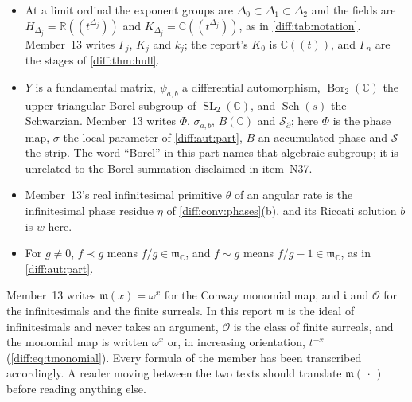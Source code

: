 \documentclass[11pt,letterpaper]{article}
\numberwithin{equation}{section}
\theoremstyle{definition}
\theoremstyle{remark}
\newcommand{\SC}{\mathbf{No}[i]}
\newcommand{\R}{\mathbb R}
\newcommand{\C}{\mathbb C}
\newcommand{\der}{\partial}
\newcommand{\Ofin}{\mathcal O}
\newcommand{\mm}{\mathfrak m}
\newcommand{\Strip}{\mathcal S}
\newcommand{\SL}{\operatorname{SL}}
\newcommand{\Sch}{\operatorname{Sch}}
\newcommand{\Bor}{\operatorname{Bor}}
\newcommand{\Sol}{\operatorname{Sol}}
\begin{document}
\begin{convention}
\begin{itemize}[leftmargin=1.6em]
\cref{diff:eq:matpinneyclassical}, and $\mathrm{Wr}_{s}$ is the same expression
for $\der_{s}$; member~13 writes $W$, which is a unitary matrix here. For a
differential subfield $F\subseteq\SC$ and $Q\in F$,
$\Sol_{F}(Q)=\{y\in F:\der^{2}y+Qy=0\}$.
\item At a limit ordinal the exponent groups are $\Delta_{0}\subset
\Delta_{1}\subset\Delta_{2}$ and the fields are
$H_{\Delta_{j}}=\R((t^{\Delta_{j}}))$ and $K_{\Delta_{j}}=\C((t^{\Delta_{j}}))$,
as in \cref{diff:tab:notation}. Member~13 writes $\Gamma_{j}$, $K_{j}$ and
$k_{j}$; the report's $K_{0}$ is $\C((t))$, and $\Gamma_{n}$ are the stages of
\cref{diff:thm:hull}.
\item $Y$ is a fundamental matrix, $\psi_{a,b}$ a differential automorphism,
$\Bor_{2}(\C)$ the upper triangular Borel subgroup of $\SL_{2}(\C)$, and
$\Sch(s)$ the Schwarzian. Member~13 writes $\Phi$, $\sigma_{a,b}$, $B(\C)$ and
$\mathcal S_{\der}$; here $\Phi$ is the phase map, $\sigma$ the local parameter
of \cref{diff:aut:part}, $B$ an accumulated phase and $\Strip$ the strip. The
word ``Borel'' in this part names that algebraic subgroup; it is unrelated to
the Borel summation disclaimed in item~N37.
\item Member~13's real infinitesimal primitive $\theta$ of an angular rate is
the infinitesimal phase residue $\eta$ of \cref{diff:conv:phases}(b), and its
Riccati solution $b$ is $w$ here.
\item For $g\neq0$, $f\prec g$ means $f/g\in\mm_{\C}$, and $f\sim g$ means
$f/g-1\in\mm_{\C}$, as in \cref{diff:aut:part}.
\end{itemize}
\end{convention}

\begin{warning}[Member~13's $\mathfrak m$ is not this report's $\mm$]
\label{diff:cp:warn:frakm}
Member~13 writes $\mathfrak m(x)=\omega^{x}$ for the Conway monomial map, and
$\mathfrak i$ and $\mathcal O$ for the infinitesimals and the finite surreals.
In this report $\mm$ is the ideal of infinitesimals and never takes an argument,
$\Ofin$ is the class of finite surreals, and the monomial map is written
$\omega^{x}$ or, in increasing orientation, $t^{-x}$ (\cref{diff:eq:tmonomial}).
Every formula of the member has been transcribed accordingly. A reader moving
between the two texts should translate $\mathfrak m(\,\cdot\,)$ before reading
anything else.
\end{warning}
\end{document}
